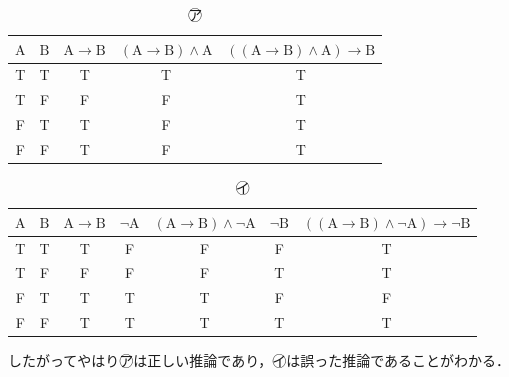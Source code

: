 \documentclass[10pt,b5paper,papersize,dvipdfmx]{jsbook}
\newcommand\rmA{\mathrm{A}}
\newcommand\rmB{\mathrm{B}}
\newcommand\maru[1]{\textcircled{\scriptsize{}#1}}
\begin{document}
\begin{table}[H]
  \centering
  \caption{\maru{ア}}
  \begin{tabular}{cc|ccc}\hline
    $\rmA$ & $\rmB$ & $\rmA \to \rmB$ & $(\rmA \to \rmB) \land \rmA$ & $((\rmA \to \rmB) \land \rmA) \to \rmB$ \\ \hline
    T & T & T & T & T \\
    T & F & F & F & T \\
    F & T & T & F & T \\
    F & F & T & F & T \\ \hline
  \end{tabular}
\end{table}
\begin{table}[H]
  \centering
  \caption{\maru{イ}}
  \begin{tabular}{cc|ccccc}\hline
    $\rmA$ & $\rmB$ & $\rmA \to \rmB$ & $\lnot \rmA$ & $(\rmA \to \rmB) \land \lnot\rmA$ & $\lnot\rmB$ & $((\rmA \to \rmB) \land \lnot\rmA) \to \lnot\rmB$ \\ \hline
    T & T & T & F & F & F & T \\
    T & F & F & F & F & T & T \\
    F & T & T & T & T & F & F \\
    F & F & T & T & T & T & T \\ \hline
  \end{tabular}
\end{table}
したがってやはり\maru{ア}は正しい推論であり，\maru{イ}は誤った推論であることがわかる．
\end{document}
